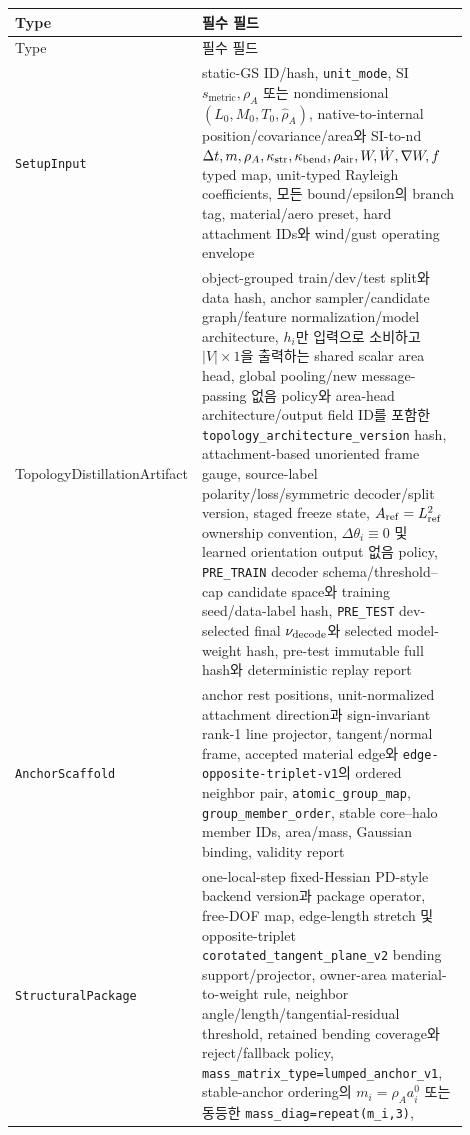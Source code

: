 \documentclass[10pt]{article}
\newcommand{\code}[1]{{\small\nolinkurl{#1}}}
\begin{document}
\begin{longtable}{L{0.25\linewidth}L{0.65\linewidth}}
\toprule
Type & 필수 필드\\
\midrule
\endfirsthead
\toprule
Type & 필수 필드\\
\midrule
\endhead
\code{SetupInput} & static-GS ID/hash, \code{unit\_mode}, SI \(s_{\mathrm{metric}},\rho_A\) 또는
nondimensional \((L_0,M_0,T_0,\widehat\rho_A)\), native-to-internal
position/covariance/area와 SI-to-nd \(\Delta t,m,\rho_A,\kappa_{\rm str},\kappa_{\rm bend},
\rho_{\rm air},W,\dot W,\nabla W,f\) typed map, unit-typed Rayleigh coefficients,
모든 bound/epsilon의 branch tag, material/aero preset, hard attachment IDs와 wind/gust operating envelope\\
{\ttfamily\small TopologyDistillation\hspace{0pt}Artifact} & object-grouped train/dev/test split와 data hash,
  anchor sampler/candidate graph/feature normalization/model architecture,
  \(h_i\)만 입력으로 소비하고 \(|V|\times1\)을 출력하는 shared scalar area head,
  global pooling/new message-passing 없음 policy와 area-head architecture/output field ID를 포함한
  \code{topology\_architecture\_version} hash, attachment-based unoriented frame gauge,
  source-label polarity/loss/symmetric decoder/split version, staged freeze state,
  \(A_{\rm ref}=L_{\rm ref}^2\) ownership convention,
  \(\Delta\theta_i\equiv0\) 및 learned orientation output 없음 policy,
  \code{PRE\_TRAIN} decoder schema/threshold--cap candidate space와 training seed/data-label hash,
  \code{PRE\_TEST} dev-selected final \(\nu_{\rm decode}\)와 selected model-weight hash,
  pre-test immutable full hash와 deterministic replay report\\
\code{AnchorScaffold} & anchor rest positions, unit-normalized attachment direction과
sign-invariant rank-1 line projector, tangent/normal frame,
accepted material edge와
\code{edge-opposite-triplet-v1}의 ordered neighbor pair, \code{atomic\_group\_map},
\code{group\_member\_order}, stable core--halo member IDs, area/mass,
Gaussian binding, validity report\\
\code{StructuralPackage} & one-local-step fixed-Hessian PD-style backend version과 package operator, free-DOF map,
edge-length stretch 및 opposite-triplet \code{corotated\_tangent\_plane\_v2} bending
support/projector, owner-area material-to-weight rule,
neighbor angle/length/tangential-residual threshold, retained bending coverage와 reject/fallback policy,
\code{mass\_matrix\_type=lumped\_anchor\_v1}, stable-anchor ordering의
\(m_i=\rho_Aa_i^0\) 또는 동등한 \code{mass\_diag=repeat(m\_i,3)},

\end{longtable}
\end{document}
